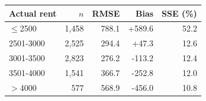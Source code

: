 \begin{tabular}{lrrrr}
\toprule
Actual rent & $n$ & RMSE & Bias & SSE (\%) \\
\midrule
$\leq$2500 & 1,458 & 788.1 & +589.6 & 52.2 \\
2501-3000 & 2,525 & 294.4 & +47.3 & 12.6 \\
3001-3500 & 2,823 & 276.2 & -113.2 & 12.4 \\
3501-4000 & 1,541 & 366.7 & -252.8 & 12.0 \\
$>$4000 & 577 & 568.9 & -456.0 & 10.8 \\
\bottomrule
\end{tabular}
